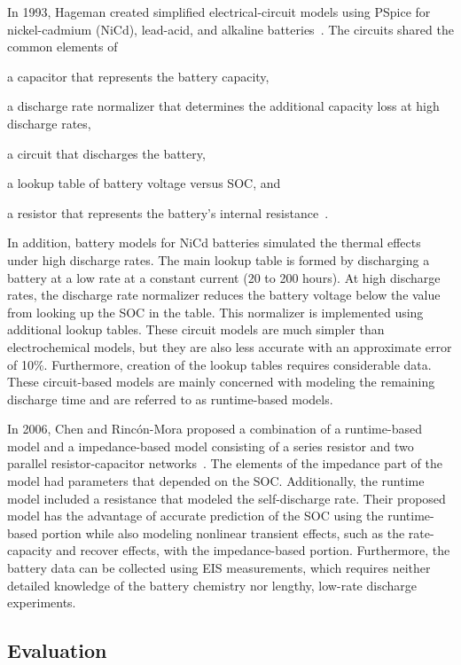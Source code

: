 \documentclass[../zhang_thesis.tex]{subfiles}
\begin{document}
In 1993, Hageman created simplified electrical-circuit models using PSpice for nickel-cadmium (NiCd), lead-acid, and alkaline batteries~\cite{hageman93}. The circuits shared the common elements of
\begin{enumerate*}[label=\emph{\roman*})]
\item a capacitor that represents the battery capacity,
\item a discharge rate normalizer that determines the additional capacity loss at high discharge rates,
\item a circuit that discharges the battery,
\item a lookup table of battery voltage versus SOC, and
\item a resistor that represents the battery's internal resistance~\cite{hageman93,hageman97}.
\end{enumerate*}
In addition, battery models for NiCd batteries simulated the thermal effects under high discharge rates. The main lookup table is formed by discharging a battery at a low rate at a constant current (20 to 200 hours). At high discharge rates, the discharge rate normalizer reduces the battery voltage below the value from looking up the SOC in the table. This normalizer is implemented using additional lookup tables. These circuit models are much simpler than electrochemical models, but they
are also less accurate with an approximate error of 10\%. Furthermore, creation of the lookup tables requires considerable data. These circuit-based models are mainly concerned with modeling the remaining discharge time and are referred to as runtime-based models.

In 2006, Chen and Rinc\'on-Mora proposed a combination of a runtime-based model and a impedance-based model consisting of a series resistor and two parallel resistor-capacitor networks~\cite{chen06}. The elements of the impedance part of the model had parameters that depended on the SOC. Additionally, the runtime model included a resistance that modeled the self-discharge rate. Their proposed model has the advantage of accurate prediction of the SOC using the runtime-based portion while also modeling
nonlinear transient effects, such as the rate-capacity and recover effects, with the impedance-based portion. Furthermore, the battery data can be collected using EIS measurements, which requires neither detailed knowledge of the battery chemistry nor lengthy, low-rate discharge experiments.

\subsection{Evaluation}
\end{document}
